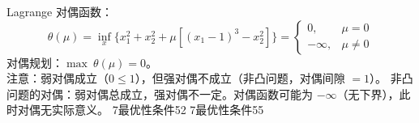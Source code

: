   {Lagrange 对偶函数：
  \[
  \theta(\mu) = \inf_{x}\{x_1^2+x_2^2 + \mu[(x_1-1)^3 - x_2^2]\}
  = \begin{cases}
  0, & \mu = 0 \\
  -\infty, & \mu \neq 0
  \end{cases}
  \]
  对偶规划：$\max\ \theta(\mu) = 0$。\\
  注意：弱对偶成立（$0 \le 1$），但强对偶不成立（非凸问题，对偶间隙 $=1$）。}
  {非凸问题的对偶：弱对偶总成立，强对偶不一定。对偶函数可能为 $-\infty$（无下界），此时对偶无实际意义。}
  {7最优性条件}{52}
  {7最优性条件}{55}
